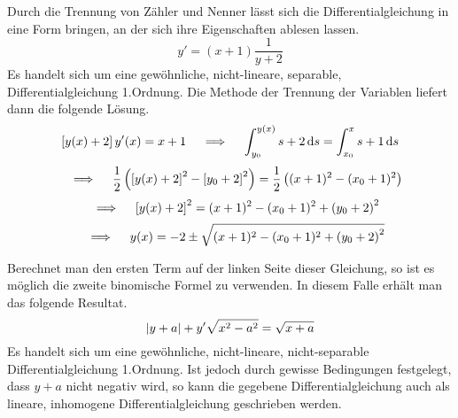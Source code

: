 \begin{atiSolution}
\begin{atiSubtaskSolutions}
{		}
		\item[\localref{dgl6}]{
			Durch die Trennung von Zähler und Nenner lässt sich die Differentialgleichung in eine Form bringen, an der sich ihre Eigenschaften ablesen lassen.
			\[
				y' = (x+1)\frac{1}{y+2}
			\]
			Es handelt sich um eine gewöhnliche, nicht-lineare, separable, Differentialgleichung 1.Ordnung.
			Die Methode der Trennung der Variablen liefert dann die folgende Lösung.
			\[
				\boxb{y(x)+2}y'(x) = x+1 \implies \integral{y_0}{y(x)}{s+2}{s} = \integral{x_0}{x}{s+1}{s}
			\]
			\[
				\implies \frac{1}{2}\curvb{\boxb{y(x)+2}^2 - \boxb{y_0 + 2}^2} = \frac{1}{2}\curvb{(x+1)^2 - (x_0+1)^2}
			\]
			\[
				\implies \boxb{y(x)+2}^2 = (x+1)^2 - (x_0+1)^2 + \curvb{y_0+2}^2
			\]
			\[
				\implies y(x) = -2 \pm \sqrt{(x+1)^2 - (x_0+1)^2 + \curvb{y_0+2}^2}
			\]
		}
		\item[\localref{dgl7}]{
			Berechnet man den ersten Term auf der linken Seite dieser Gleichung, so ist es möglich die zweite binomische Formel zu verwenden.
			In diesem Falle erhält man das folgende Resultat.
			\[
				\left\vert y+a \right\vert + y'\sqrt{x^2-a^2} = \sqrt{x+a}
			\]
			Es handelt sich um eine gewöhnliche, nicht-lineare, nicht-separable Differentialgleichung 1.Ordnung.
			Ist jedoch durch gewisse Bedingungen festgelegt, dass $y+a$ nicht negativ wird, so kann die gegebene Differentialgleichung auch als lineare, inhomogene Differentialgleichung geschrieben werden.
		}
	\end{atiSubtaskSolutions}
\end{atiSolution}